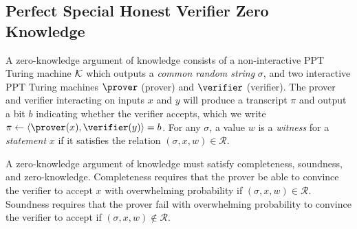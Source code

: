 \subsection{Perfect Special Honest Verifier Zero Knowledge}

A zero-knowledge argument of knowledge consists of a non-interactive PPT Turing
machine $\mathcal{K}$ which outputs a \emph{common random string} $\sigma$, and two interactive PPT Turing machines $\prover$ (prover) and $\verifier$ (verifier).
The prover and verifier interacting on inputs $x$ and $y$ will
produce a transcript $\pi$ and output a bit $b$ indicating whether the verifier accepts, which we write $\pi \gets
\ip{\prover(x)}{\verifier(y)} = b$.
For any $\sigma$, a value $w$ is a \emph{witness} for a \emph{statement} $x$ if it
satisfies the relation $(\sigma, x, w) \in \mathcal{R}$.

A zero-knowledge argument of knowledge must satisfy completeness, soundness, and zero-knowledge.
Completeness requires that the
prover be able to convince the verifier to accept $x$ with overwhelming probability
if $(\sigma, x, w) \in \mathcal{R}$.
Soundness requires that the prover fail with
overwhelming probability to convince the verifier to accept if $(\sigma, x, w) \notin
\mathcal{R}$.


